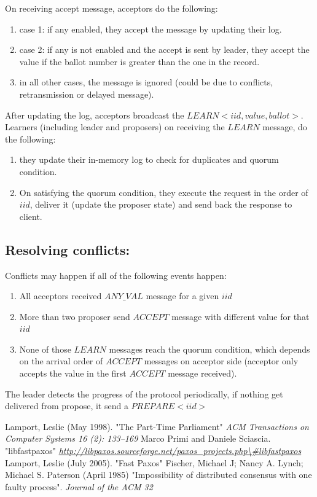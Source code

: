 \noindent
On receiving accept message, acceptors do the following:
\begin{enumerate}
\item case 1: if any enabled, they accept the message by updating their log.
\item case 2: if any is not enabled and the accept is sent by leader, they accept the value if the ballot number is greater than the one in the record.
\item in all other cases, the message is ignored (could be due to conflicts, retransmission or delayed message).
\end{enumerate}

After updating the log, acceptors broadcast the $LEARN<iid, value, ballot>$. \\
\noindent
Learners (including leader and proposers) on receiving the $LEARN$ message, do the following:
\begin{enumerate}
\item they update their in-memory log to check for duplicates and quorum condition.
\item On satisfying the quorum condition, they execute the request in the order of $iid$, deliver it (update the proposer state) and send back the response to client.
\end{enumerate}


\subsection{Resolving conflicts:}
Conflicts may happen if all of the following events happen:

\begin{enumerate}
\item All acceptors received $ANY\_VAL$ message for a given $iid$
\item More than two proposer send $ACCEPT$ message with different value for that $iid$
\item None of those $LEARN$ messages reach the quorum condition, which depends on the arrival order of $ACCEPT$ messages on acceptor side (acceptor only accepts the value in the first $ACCEPT$ message received). 
\end{enumerate}

\noindent
The leader detects the progress of the protocol periodically, if nothing get delivered from propose, it send a $PREPARE<iid>$ 


\begin{thebibliography}{100} 
 Lamport, Leslie (May 1998). "The Part-Time Parliament" \emph{ ACM Transactions on Computer Systems 16 (2): 133–169}
 Marco Primi and Daniele Sciascia. "libfastpaxos" \emph{\url{http://libpaxos.sourceforge.net/paxos_projects.php\\#libfastpaxos}}
 Lamport, Leslie (July 2005). "Fast Paxos" \emph{}
 Fischer, Michael J; Nancy A. Lynch; Michael S. Paterson (April 1985)  "Impossibility of distributed consensus with one faulty process". \emph{Journal of the ACM 32}
\end{thebibliography} 

